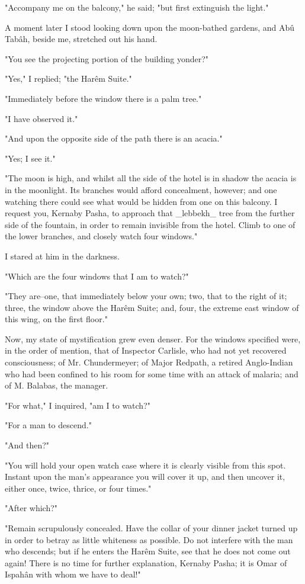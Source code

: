 "Accompany me on the balcony," he said; "but first extinguish the
light."

A moment later I stood looking down upon the moon-bathed gardens,
and Abû Tabâh, beside me, stretched out his hand.

"You see the projecting portion of the building yonder?"

"Yes," I replied; "the Harêm Suite."

"Immediately before the window there is a palm tree."

"I have observed it."

"And upon the opposite side of the path there is an acacia."

"Yes; I see it."

"The moon is high, and whilst all the side of the hotel is in shadow
the acacia is in the moonlight. Its branches would afford concealment,
however; and one watching there could see what would be hidden from
one on this balcony. I request you, Kernaby Pasha, to approach that
_lebbekh_ tree from the further side of the fountain, in order to
remain invisible from the hotel. Climb to one of the lower branches,
and closely watch four windows."

I stared at him in the darkness.

"Which are the four windows that I am to watch?"

"They are--one, that immediately below your own; two, that to the
right of it; three, the window above the Harêm Suite; and, four,
the extreme east window of this wing, on the first floor."

Now, my state of mystification grew even denser. For the windows
specified were, in the order of mention, that of Inspector Carlisle,
who had not yet recovered consciousness; of Mr. Chundermeyer; of
Major Redpath, a retired Anglo-Indian who had been confined to his
room for some time with an attack of malaria; and of M. Balabas,
the manager.

"For what," I inquired, "am I to watch?"

"For a man to descend."

"And then?"

"You will hold your open watch case where it is clearly visible from
this spot. Instant upon the man's appearance you will cover it up,
and then uncover it, either once, twice, thrice, or four times."

"After which?"

"Remain scrupulously concealed. Have the collar of your dinner jacket
turned up in order to betray as little whiteness as possible. Do not
interfere with the man who descends; but if he enters the Harêm Suite,
see that he does not come out again! There is no time for further
explanation, Kernaby Pasha; it is Omar of Ispahân with whom we have
to deal!"


